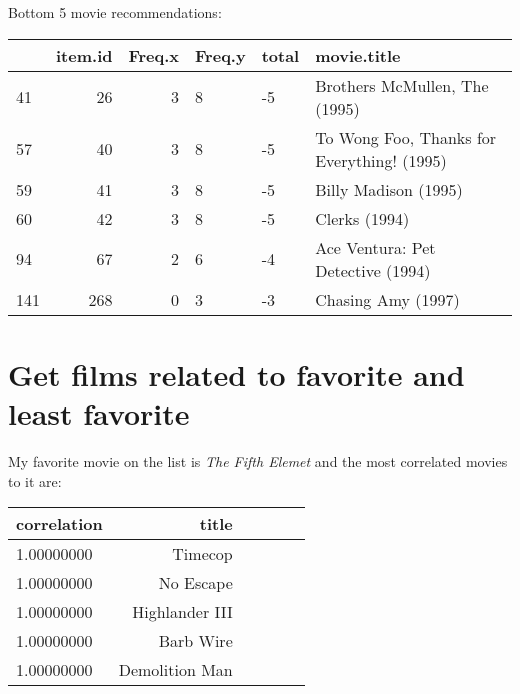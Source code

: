 \documentclass[12pt, a4paper]{article}
\begin{document}
Bottom 5 movie recommendations:

\begin{minipage}{\linewidth} %
\vspace{2em}
\centering
\begin{tabular}{|l|r|r|l|l|l|}
    \hline
      & item.id & Freq.x & Freq.y & total & movie.title\\
    \hline
    41 & 26 & 3 & 8 & -5 & Brothers McMullen, The (1995)\\
    \hline
    57 & 40 & 3 & 8 & -5 & To Wong Foo, Thanks for Everything! (1995)\\
    \hline
    59 & 41 & 3 & 8 & -5 & Billy Madison (1995)\\
    \hline
    60 & 42 & 3 & 8 & -5 & Clerks (1994)\\
    \hline
    94 & 67 & 2 & 6 & -4 & Ace Ventura: Pet Detective (1994)\\
    \hline
    141 & 268 & 0 & 3 & -3 & Chasing Amy (1997)\\
    \hline
\end{tabular}
\vspace{2em}
\end{minipage}



\newpage
\section{Get films related to favorite and least favorite}

My favorite movie on the list is \emph{The Fifth Elemet} and the most correlated movies to it are:

\begin{minipage}{\linewidth} %
\vspace{2em}
\centering
\begin{tabular}{|l|r|r|l|l|l|}
        \hline
        correlation & title\\
        \hline
        1.00000000 & Timecop\\
        \hline
        1.00000000 & No Escape\\
        \hline
        1.00000000 & Highlander III\\
        \hline
        1.00000000 & Barb Wire\\
        \hline
        1.00000000 & Demolition Man\\
        \hline
\end{tabular}
\vspace{2em}
\end{minipage}
\end{document}
